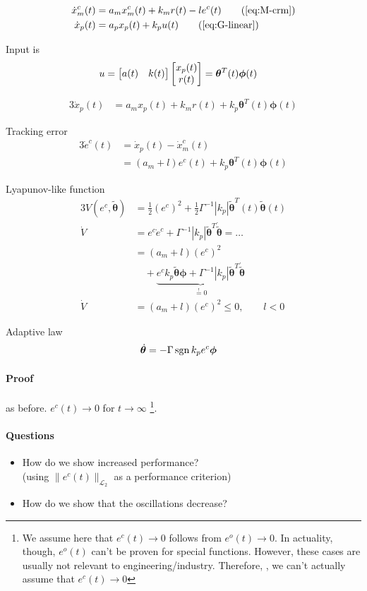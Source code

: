 \begin{alignat*}{3}
\dot{x}_m^c(t) &= a_m x_m^c(t) + k_m r(t) - le^c(t)
    \tag{\ref{eq:M-crm}}\\
\dot{x}_p(t) &= a_p x_p(t) + k_p u(t) 
    \tag{\ref{eq:G-linear}}
\end{alignat*}

Input is
\begin{alignat*}{3}
u &= \matr{a(t) & k(t)} \matr{x_p(t) \\ r(t)}%
    = \bm{\theta}^T(t) \bm{\phi}(t) 
\end{alignat*}

\begin{alignat*}{3}
\dot{x}_p(t) &= a_m x_p(t) + k_m r(t) + k_p \bm{\theta}^T(t) \bm{\phi}(t)
\end{alignat*}

Tracking error
\begin{alignat*}{3}
\dot{e}^c(t) &= \dot{x}_p(t) - \dot{x}_m^c(t)\\
    &= \left( a_m + l \right) e^c(t) + k_p \bm{\theta}^T(t) \bm{\phi}(t)
\end{alignat*}

Lyapunov-like function
\begin{alignat*}{3}
V(e^c, \tilde{\bm{\theta}})
    &= \frac{1}{2} (e^c)^2 + \frac{1}{2} \Gamma^{-1} |k_p| \bm{\tilde{\theta}}^T(t) \bm{ \tilde{\theta}}(t)\\
\dot{V}
    &= e^c \dot{e}^c + \Gamma^{-1} |k_p| \tilde{\bm{\theta}}^T \bm{\dot{ \tilde{\theta}}} = \dots\\
    &= \left( a_m + l \right) (e^c)^2\\
    & \quad     + \underbrace{e^c k_p \tilde{\bm{\theta}} \bm{ \phi}
        + \Gamma^{-1} |k_p| \tilde{\bm{\theta}}^T \bm{\dot{ \tilde{\theta}}}}_{ \overset{!}{=} 0}\\
\dot{V} &= \left( a_m + l \right) (e^c)^2 \leq 0, \qquad l < 0
\end{alignat*}

Adaptive law
\begin{alignat*}{3}
\dot{\bm{\theta}} &= -\Gamma \operatorname{sgn}{k_p} e^c \bm{\phi}
\end{alignat*}

\paragraph{Proof} as before.
$e^c(t) \rightarrow 0$ for $t \rightarrow \infty$ %
\footnote{We assume here that $e^c(t) \rightarrow 0$ follows from
$e^o(t) \rightarrow 0$. In actuality, though, $e^o(t)$ can't
be proven for special functions. However, these cases
are usually not relevant to engineering/industry.
Therefore, , we can't actually assume
that $e^c(t) \rightarrow 0$}.

\paragraph{Questions}
\begin{itemize}
\item How do we show increased performance?\\
    (using $\| e^c(t) \|_{ \mathcal{L}_2}$ as a performance criterion)
\item How do we show that the oscillations decrease?
\end{itemize}

